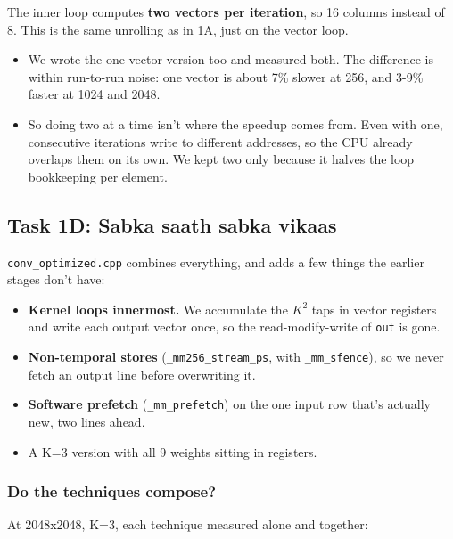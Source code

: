 \documentclass[
  10pt,
]{article}
\providecommand{\tightlist}{%
  \setlength{\itemsep}{0pt}\setlength{\parskip}{0pt}}
\begin{document}
The inner loop computes \textbf{two vectors per iteration}, so 16 columns
instead of 8. This is the same unrolling as in 1A, just on the vector loop.

\begin{itemize}
\tightlist
\item
  We wrote the one-vector version too and measured both. The difference is
  within run-to-run noise: one vector is about 7\% slower at 256, and 3-9\%
  faster at 1024 and 2048.
\item
  So doing two at a time isn't where the speedup comes from. Even with one,
  consecutive iterations write to different addresses, so the CPU already
  overlaps them on its own. We kept two only because it halves the loop
  bookkeeping per element.
\end{itemize}

\subsection{Task 1D: Sabka saath sabka
vikaas}\label{task-1d-sabka-saath-sabka-vikaas}

\texttt{conv\_optimized.cpp} combines everything, and adds a few things the
earlier stages don't have:

\begin{itemize}
\tightlist
\item
  \textbf{Kernel loops innermost.} We accumulate the $K^2$ taps in vector
  registers and write each output vector once, so the read-modify-write of
  \texttt{out} is gone.

\item
  \textbf{Non-temporal stores} (\texttt{\_mm256\_stream\_ps}, with
  \texttt{\_mm\_sfence}), so we never fetch an output line before
  overwriting it.

\item
  \textbf{Software prefetch} (\texttt{\_mm\_prefetch}) on the one input row
  that's actually new, two lines ahead.

\item
  A K=3 version with all 9 weights sitting in registers.
\end{itemize}

\subsubsection{Do the techniques
compose?}\label{do-the-techniques-compose}

At 2048x2048, K=3, each technique measured alone and together:
\end{document}
